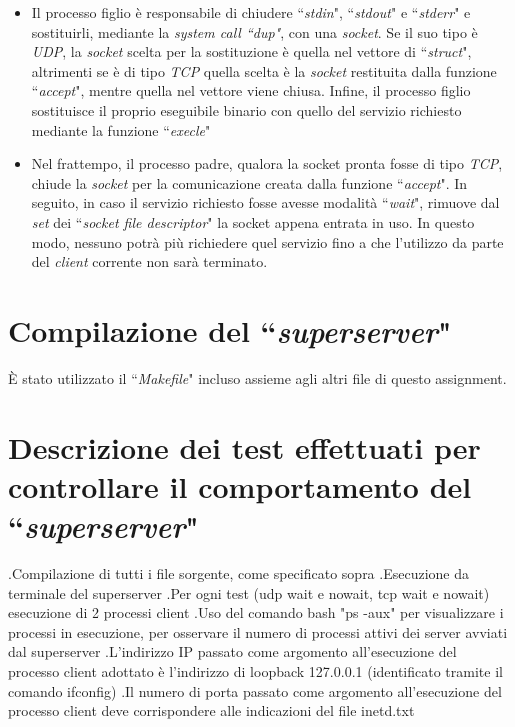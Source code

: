 \documentclass[a4paper, 12pt]{report}
\begin{document}
\begin{itemize}
    \item Il processo figlio è responsabile di chiudere ``\textit{stdin}", ``\textit{stdout}" e ``\textit{stderr}" e sostituirli, mediante la \textit{system call ``dup"},
    con una \textit{socket}. Se il suo tipo è \textit{UDP}, la \textit{socket} scelta per la sostituzione è quella nel vettore di ``\textit{struct}", altrimenti se è di tipo \textit{TCP}
    quella scelta è la \textit{socket} restituita dalla funzione ``\textit{accept}", mentre quella nel vettore viene chiusa. Infine, il processo figlio sostituisce il proprio
    eseguibile binario con quello del servizio richiesto mediante la funzione ``\textit{execle}"
    \item Nel frattempo, il processo padre, qualora la socket pronta fosse di tipo \textit{TCP}, chiude la \textit{socket} per la comunicazione creata dalla funzione ``\textit{accept}".
    In seguito, in caso il servizio richiesto fosse avesse modalità ``\textit{wait}", rimuove dal \textit{set} dei ``\textit{socket file descriptor}" la socket appena entrata in
    uso. In questo modo, nessuno potrà più richiedere quel servizio fino a che l'utilizzo da parte del \textit{client} corrente non sarà terminato. 
\end{itemize}

\section{Compilazione del ``\textit{superserver}"}

È stato utilizzato il ``\textit{Makefile}" incluso assieme agli altri file di questo assignment.

\section{Descrizione dei test effettuati per controllare il comportamento del ``\textit{superserver}"}

.Compilazione di tutti i file sorgente, come specificato sopra
		.Esecuzione da terminale del superserver
		.Per ogni test (udp wait e nowait, tcp wait e nowait) esecuzione di 2 processi client
		.Uso del comando bash "ps -aux" per visualizzare i processi in esecuzione,
		 per osservare il numero di processi attivi dei server avviati dal superserver
		.L'indirizzo IP passato come argomento all'esecuzione del processo client adottato è 
		 l'indirizzo di loopback 127.0.0.1 (identificato tramite il comando ifconfig)
		.Il numero di porta passato come argomento all'esecuzione del processo client
		 deve corrispondere alle indicazioni del file inetd.txt
\end{document}
